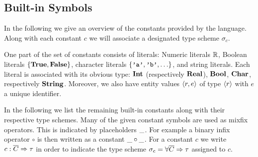 \subsection{Built-in Symbols}
\label{sec:built-symbols}


In the following we give an overview of the constants provided by the
language. Along with each constant $c$ we will associate a designated
type scheme $\sigma_c$.

One part of the set of constants consists of literals: Numeric
literals ${\mathbb R}$, Boolean literals $\left\{\mathbf{True}, \mathbf{False}\right\}$, character
literals $\left\{\texttt{'a'}, \texttt{'b'}, \ldots\right\}$, and string
literals. Each literal is associated with its obvious type: $\mathbf{Int}$
(respectively $\mathbf{Real}$), $\mathbf{Bool}$, $\mathbf{Char}$, respectively
$\mathbf{String}$. Moreover, we also have entity values $\left\langle r,e\right\rangle$ of
type $\left\langle r\right\rangle$ with $e$ a unique identifier.


In the following we list the remaining built-in constants along with
their respective type schemes. Many of the given constant symbols are
used as mixfix operators. This is indicated by placeholders
$\_$. For example a binary infix operator $\circ$ is then written
as a constant $\_ \circ \_$. For a constant $c$ we write $c :
\overline{C} \Rightarrow \tau$ in order to indicate the type scheme $\sigma_c =
\forall \overline{C} \Rightarrow \tau$ assigned to $c$.

